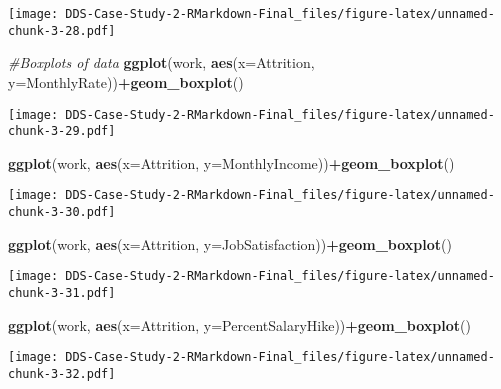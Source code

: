 \documentclass[]{article}
\newenvironment{Shaded}{\begin{snugshade}}{\end{snugshade}}
\newcommand{\CommentTok}[1]{\textcolor[rgb]{0.56,0.35,0.01}{\textit{#1}}}
\newcommand{\DataTypeTok}[1]{\textcolor[rgb]{0.13,0.29,0.53}{#1}}
\newcommand{\KeywordTok}[1]{\textcolor[rgb]{0.13,0.29,0.53}{\textbf{#1}}}
\newcommand{\NormalTok}[1]{#1}
\newcommand{\OperatorTok}[1]{\textcolor[rgb]{0.81,0.36,0.00}{\textbf{#1}}}
\begin{document}
\texttt{[image: DDS-Case-Study-2-RMarkdown-Final\_files/figure-latex/unnamed-chunk-3-28.pdf]}

\begin{Shaded}
\begin{Highlighting}[]
\CommentTok{#Boxplots of data}
\KeywordTok{ggplot}\NormalTok{(work, }\KeywordTok{aes}\NormalTok{(}\DataTypeTok{x=}\NormalTok{Attrition, }\DataTypeTok{y=}\NormalTok{MonthlyRate))}\OperatorTok{+}\KeywordTok{geom_boxplot}\NormalTok{()}
\end{Highlighting}
\end{Shaded}

\texttt{[image: DDS-Case-Study-2-RMarkdown-Final\_files/figure-latex/unnamed-chunk-3-29.pdf]}

\begin{Shaded}
\begin{Highlighting}[]
\KeywordTok{ggplot}\NormalTok{(work, }\KeywordTok{aes}\NormalTok{(}\DataTypeTok{x=}\NormalTok{Attrition, }\DataTypeTok{y=}\NormalTok{MonthlyIncome))}\OperatorTok{+}\KeywordTok{geom_boxplot}\NormalTok{()}
\end{Highlighting}
\end{Shaded}

\texttt{[image: DDS-Case-Study-2-RMarkdown-Final\_files/figure-latex/unnamed-chunk-3-30.pdf]}

\begin{Shaded}
\begin{Highlighting}[]
\KeywordTok{ggplot}\NormalTok{(work, }\KeywordTok{aes}\NormalTok{(}\DataTypeTok{x=}\NormalTok{Attrition, }\DataTypeTok{y=}\NormalTok{JobSatisfaction))}\OperatorTok{+}\KeywordTok{geom_boxplot}\NormalTok{()}
\end{Highlighting}
\end{Shaded}

\texttt{[image: DDS-Case-Study-2-RMarkdown-Final\_files/figure-latex/unnamed-chunk-3-31.pdf]}

\begin{Shaded}
\begin{Highlighting}[]
\KeywordTok{ggplot}\NormalTok{(work, }\KeywordTok{aes}\NormalTok{(}\DataTypeTok{x=}\NormalTok{Attrition, }\DataTypeTok{y=}\NormalTok{PercentSalaryHike))}\OperatorTok{+}\KeywordTok{geom_boxplot}\NormalTok{()}
\end{Highlighting}
\end{Shaded}

\texttt{[image: DDS-Case-Study-2-RMarkdown-Final\_files/figure-latex/unnamed-chunk-3-32.pdf]}
\end{document}
